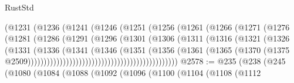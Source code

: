 \begin{lexlean}{RustStd}
\begin{coremodule}
{\begin{coremodule}
{{{{{{{{{{{{{{{{{{{{{{{{{{{{{{{{{{{{{{{{{{{{{{{{{{{{{{{{{{{{                                      (@1231
                                        (@1236
                                          (@1241
                                            (@1246
                                              (@1251
                                                (@1256
                                                  (@1261
                                                    (@1266
                                                      (@1271
                                                        (@1276
                                                          (@1281
                                                            (@1286
                                                              (@1291
                                                                (@1296
                                                                  (@1301
                                                                    (@1306
                                                                      (@1311
                                                                        (@1316
                                                                          (@1321
                                                                            (@1326
                                                                              (@1331
                                                                                (@1336
                                                                                  (@1341
                                                                                    (@1346
                                                                                      (@1351
                                                                                        (@1356
                                                                                          (@1361
                                                                                            (@1365
                                                                                              (@1370
                                                                                                (@1375
                                                                                                  @2509)))))))))))))))))))))))))))))))))))))))))))))))
@2578 := @235
    (@238
      (@245
        (@1080
          (@1084
            (@1088
              (@1092
                (@1096
                  (@1100
                    (@1104
                      (@1108
                        (@1112
}}}}}}}}}}}}}}}}}}}}}}}}}}}}}}}}}}}}}}}}}}}}}}}}}}}}}}}}}}}}
\end{coremodule}}
\end{coremodule}
\end{lexlean}
